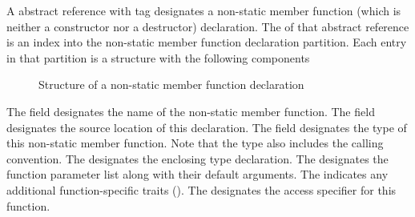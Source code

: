 A  abstract reference with tag  designates a non-static member function (which is neither a constructor nor a destructor) declaration.
The  of that abstract reference is an index into the non-static member function declaration partition.
Each entry in that partition is a structure with the following components
%
\begin{figure}[H]
	\centering
	\caption{Structure of a non-static member function declaration}
	\label{fig:ifc-method-decl-structure}
\end{figure}
%
The  field designates the name of the non-static member function.
The  field designates the source location of this declaration.
The  field designates the type of this non-static member function.  Note that the type also includes the calling convention.
The  designates the enclosing type declaration.
The  designates the function parameter list along with their default arguments.
The  indicates any additional function-specific traits ().
The  designates the access specifier for this function.



\subsection{} 
\label{sec:ifc:DeclSort:Constructor}

